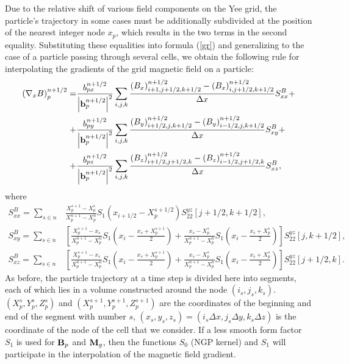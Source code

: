 \documentclass[final,3p]{elsarticle}
\begin{document}
Due to the relative shift of various field components on the Yee grid, the particle's trajectory in some cases must be additionally subdivided at the position of the nearest integer node $x_p$, which results in the two terms in the second equality. Substituting these equalities into formula (\ref{gr}) and generalizing to the case of a particle passing through several cells, we obtain the following rule for interpolating the gradients of the grid magnetic field on a particle:  
\begin{align}
	\left(\nabla_x B\right)_p^{n+1/2}=&\frac{b_{px}^{n+1/2}}{\left|{\bf b}_p^{n+1/2}\right|^2}\sum\limits_{i,j,k} \frac{(B_x)_{i+1,j+1/2,k+1/2}^{n+1/2}-(B_x)_{i,j+1/2,k+1/2}^{n+1/2}}{\Delta x} S_{xx}^{B}+\nonumber \\
	+&\frac{b_{py}^{n+1/2}}{\left|{\bf b}_p^{n+1/2}\right|^2}\sum\limits_{i,j,k} \frac{(B_y)_{i+1/2,j,k+1/2}^{n+1/2}-(B_y)_{i-1/2,j,k+1/2}^{n+1/2}}{\Delta x} S_{xy}^B+\nonumber \\
	+&\frac{b_{pz}^{n+1/2}}{\left|{\bf b}_p^{n+1/2}\right|^2}\sum\limits_{i,j,k} \frac{(B_z)_{i+1/2,j+1/2,k}^{n+1/2}-(B_z)_{i-1/2,j+1/2,k}^{n+1/2}}{\Delta x} S_{xz}^B,\label{gradB}
\end{align}
where 
\begin{align}
	S_{xx}^{B}=\sum\limits_{s\in n} &\frac{X_p^{s+1}-X_p^s}{X_p^{n+1}-X_p^n} S_1\left(x_{i+1/2}-X_p^{s+1/2}\right) S_{22}^{yz}[j+1/2,k+1/2], \\
	S_{xy}^{B}=\sum\limits_{s\in n} &\left[\frac{X_p^{s+1}-x_s}{X_p^{n+1}-X_p^n} S_1\left(x_{i}-\frac{x_s+X_p^{s+1}}{2}\right)+\frac{x_s-X_p^{s}}{X_p^{n+1}-X_p^n} S_1\left(x_{i}-\frac{x_s+X_p^{s}}{2}\right)\right]S_{22}^{yz}[j,k+1/2], \\
	S_{xz}^{B}=\sum\limits_{s\in n} &\left[\frac{X_p^{s+1}-x_s}{X_p^{n+1}-X_p^n} S_1\left(x_{i}-\frac{x_s+X_p^{s+1}}{2}\right)+\frac{x_s-X_p^{s}}{X_p^{n+1}-X_p^n} S_1\left(x_{i}-\frac{x_s+X_p^{s}}{2}\right)\right]S_{22}^{yz}[j+1/2,k]. 
\end{align}
As before, the particle trajectory at a time step is divided here into segments, each of which lies in a volume constructed around the node $(i_s,j_s,k_s)$. $(X_p^{s},Y_p^s,Z_p^s)$ and $(X_p^{s+1},Y_p^{s+1},Z_p^{s+1})$ are the coordinates of the beginning and end of the segment with number $s$, $(x_s,y_s,z_s)=(i_s\Delta x, j_s \Delta y, k_s \Delta z)$ is the coordinate of the node of the cell that we consider. If a less smooth form factor $S_1$ is used for ${\bf B}_p$ and ${\bf M}_g$, then the functions $S_0$ (NGP kernel) and $S_1$ will participate in the interpolation of the magnetic field gradient.
\end{document}
